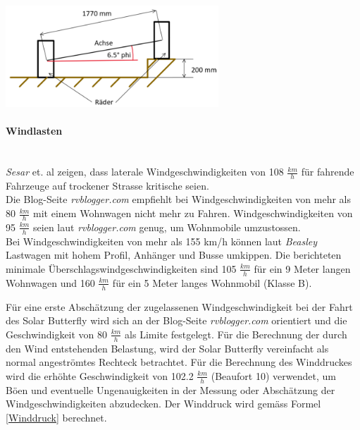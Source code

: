 \begin{description}
    \begin{center}
      \includegraphics[width=0.6\textwidth]{04_Figures/1.5 Skizze.png}
      \label{1.5 Skizze}
    \end{center}

  \end{description}

  \paragraph{Windlasten}\mbox{}\\
  \emph{Sesar} et. al \cite{Wind.1} zeigen, dass laterale Windgeschwindigkeiten von 108 $\frac{km}{h}$ für fahrende Fahrzeuge auf trockener Strasse kritische seien.\\
  Die Blog-Seite \emph{rvblogger.com} \cite{Wind.2} empfiehlt bei Windgeschwindigkeiten von mehr als 80 $\frac{km}{h}$ mit einem Wohnwagen nicht mehr zu Fahren. Windgeschwindigkeiten von 95 $\frac{km}{h}$ seien laut \emph{rvblogger.com} genug, um Wohnmobile umzustossen.\\
  Bei Windgeschwindigkeiten von mehr als 155 km/h können laut \emph{Beasley} \cite{Wind.3} Lastwagen mit hohem Profil, Anhänger und Busse umkippen. Die berichteten minimale Überschlagswindgeschwindigkeiten sind 105 $\frac{km}{h}$ für ein 9 Meter langen Wohnwagen und 160 $\frac{km}{h}$ für ein 5 Meter langes Wohnmobil (Klasse B).

  Für eine erste Abschätzung der zugelassenen Windgeschwindigkeit bei der Fahrt des Solar Butterfly wird sich an der Blog-Seite \emph{rvblogger.com} orientiert und die Geschwindigkeit von 80 $\frac{km}{h}$ als Limite festgelegt. Für die Berechnung der durch den Wind entstehenden Belastung, wird der Solar Butterfly vereinfacht als normal angeströmtes Rechteck betrachtet. Für die Berechnung des Winddruckes wird die erhöhte Geschwindigkeit von 102.2 $\frac{km}{h}$ (Beaufort 10) verwendet, um Böen und eventuelle Ungenauigkeiten in der Messung oder Abschätzung der Windgeschwindigkeiten abzudecken. Der Winddruck wird gemäss Formel \ref{Winddruck} berechnet.

